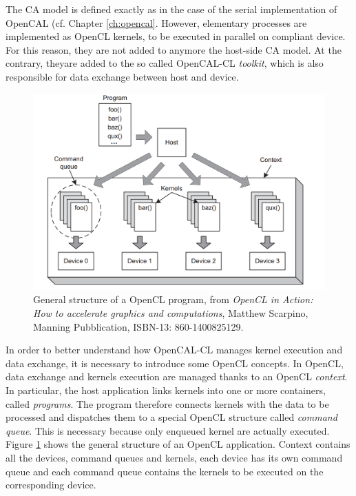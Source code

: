 The CA model is defined exactly as in the case of the serial
implementation of OpenCAL (cf. Chapter \ref{ch:opencal}. However,
elementary processes are implemented as OpenCL kernels, to be executed
in parallel on compliant device. For this reason, they are not added
to anymore the host-side CA model. At the contrary, theyare added to
the so called OpenCAL-CL \emph{toolkit}, which is also responsible for
data exchange between host and device.

\begin{figure}[tp]
  \begin{center}
    \includegraphics[width=12cm]{./images/OpenCAL-CL/kernelDistribution}
    \caption{General structure of a OpenCL program, from \emph{OpenCL
        in Action: How to accelerate graphics and computations},
      Matthew Scarpino, Manning Pubblication, ISBN-13:
      860-1400825129.}
    \label{fig:GeneralStructure}
  \end{center}
\end{figure}

In order to better understand how OpenCAL-CL manages kernel execution
and data exchange, it is necessary to introduce some OpenCL
concepts. In OpenCL, data exchange and kernels execution are managed
thanks to an OpenCL \emph{context}. In particular, the host
application links kernels into one or more containers, called
\emph{programs}. The program therefore connects kernels with the data
to be processed and dispatches them to a special OpenCL structure
called \emph{command queue}. This is necessary because only enqueued
kernel are actually executed. Figure \ref{fig:GeneralStructure} shows
the general structure of an OpenCL application. Context contains all the
devices, command queues and kernels, each device has its own command
queue and each command queue contains the kernels to be executed on
the corresponding device.

